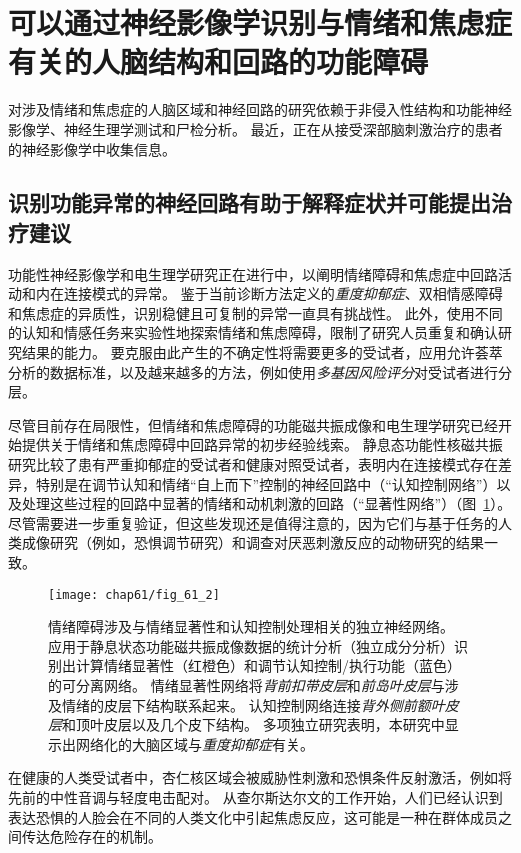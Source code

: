\section{可以通过神经影像学识别与情绪和焦虑症有关的人脑结构和回路的功能障碍}

对涉及情绪和焦虑症的人脑区域和神经回路的研究依赖于非侵入性结构和功能神经影像学、神经生理学测试和尸检分析。
最近，正在从接受深部脑刺激治疗的患者的神经影像学中收集信息。



\subsection{识别功能异常的神经回路有助于解释症状并可能提出治疗建议}

功能性神经影像学和电生理学研究正在进行中，以阐明情绪障碍和焦虑症中回路活动和内在连接模式的异常。
鉴于当前诊断方法定义的\textit{重度抑郁症}、双相情感障碍和焦虑症的异质性，识别稳健且可复制的异常一直具有挑战性。
此外，使用不同的认知和情感任务来实验性地探索情绪和焦虑障碍，限制了研究人员重复和确认研究结果的能力。
要克服由此产生的不确定性将需要更多的受试者，应用允许荟萃分析的数据标准，以及越来越多的方法，例如使用\textit{多基因风险评分}对受试者进行分层。


尽管目前存在局限性，但情绪和焦虑障碍的功能磁共振成像和电生理学研究已经开始提供关于情绪和焦虑障碍中回路异常的初步经验线索。
静息态功能性核磁共振研究比较了患有严重抑郁症的受试者和健康对照受试者，表明内在连接模式存在差异，特别是在调节认知和情绪“自上而下”控制的神经回路中（“认知控制网络”）以及处理这些过程的回路中显著的情绪和动机刺激的回路（“显著性网络”）（图~\ref{fig:61_2}）。
尽管需要进一步重复验证，但这些发现还是值得注意的，因为它们与基于任务的人类成像研究（例如，恐惧调节研究）和调查对厌恶刺激反应的动物研究的结果一致。


\begin{figure}[htbp]
	\centering
	\texttt{[image: chap61/fig\_61\_2]}
	\caption{情绪障碍涉及与情绪显著性和认知控制处理相关的独立神经网络。
		应用于静息状态功能磁共振成像数据的统计分析（独立成分分析）识别出计算情绪显著性（红橙色）和调节认知控制/执行功能（蓝色）的可分离网络。
		情绪显著性网络将\textit{背前扣带皮层}和\textit{前岛叶皮层}与涉及情绪的皮层下结构联系起来。
		认知控制网络连接\textit{背外侧前额叶皮层}和顶叶皮层以及几个皮下结构。
		多项独立研究表明，本研究中显示出网络化的大脑区域与\textit{重度抑郁症}有关\cite{seeley2007dissociable}。}
	\label{fig:61_2}
\end{figure}


在健康的人类受试者中，杏仁核区域会被威胁性刺激和恐惧条件反射激活，例如将先前的中性音调与轻度电击配对。
从查尔斯达尔文的工作开始，人们已经认识到表达恐惧的人脸会在不同的人类文化中引起焦虑反应，这可能是一种在群体成员之间传达危险存在的机制。


